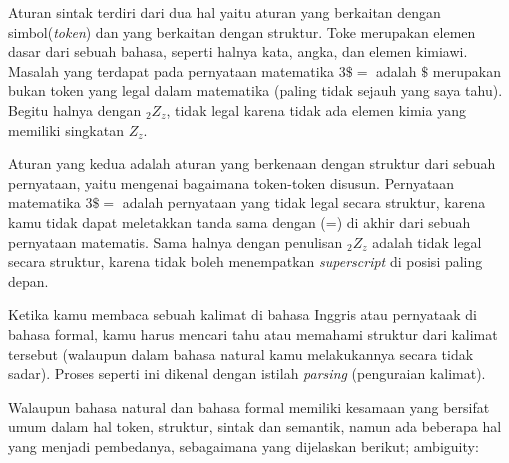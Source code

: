 Aturan sintak terdiri dari dua hal yaitu aturan yang berkaitan dengan simbol(\textit{token}) dan yang berkaitan dengan struktur. Toke merupakan elemen dasar dari sebuah bahasa, seperti halnya kata, angka, dan elemen kimiawi. Masalah yang terdapat pada pernyataan matematika $ 3\$=$ adalah $ \$ $ merupakan bukan token yang legal dalam matematika (paling tidak sejauh yang saya tahu). Begitu halnya dengan $_{2}Z_{z}$, tidak legal karena tidak ada elemen kimia yang memiliki singkatan $ Z_{z} $.

Aturan yang kedua adalah aturan yang berkenaan dengan struktur dari sebuah pernyataan, yaitu mengenai bagaimana token-token disusun. Pernyataan matematika $ 3\$=$ adalah pernyataan yang tidak legal secara struktur, karena kamu tidak dapat meletakkan tanda sama dengan (=) di akhir dari sebuah pernyataan matematis. Sama halnya dengan penulisan $_{2}Z_{z}$ adalah tidak legal secara struktur, karena tidak boleh menempatkan \textit{superscript} di posisi paling depan.

Ketika kamu membaca sebuah kalimat di bahasa Inggris atau pernyataak di bahasa formal, kamu harus mencari tahu atau memahami struktur dari kalimat tersebut (walaupun dalam bahasa natural kamu melakukannya secara tidak sadar). Proses seperti ini dikenal dengan istilah \textit{parsing} (penguraian kalimat).

Walaupun bahasa natural dan bahasa formal memiliki kesamaan yang bersifat umum dalam hal token, struktur, sintak dan semantik, namun ada beberapa hal yang menjadi pembedanya, sebagaimana yang dijelaskan berikut;
ambiguity: 


